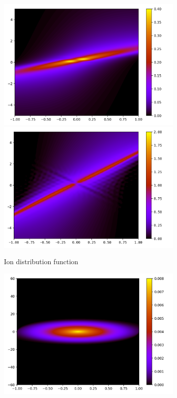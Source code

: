 \documentclass{article}
\numberwithin{equation}{section}
\newcommand{\imh}{\textheight} %
\newcommand{\imw}{\textwidth} %
\begin{document}
\begin{figure}
	\begin{subfigure}{\textwidth}
		\centering
		\includegraphics[height=\imh,width=\imw]{images/fiT20_FD.png}
		\includegraphics[height=\imh,width=\imw]{images/fiT20_512.png}
		\caption{Ion distribution function}
		\label{subfig:compT02_ion}
	\end{subfigure}
	\begin{subfigure}{\textwidth}
		\centering
		\includegraphics[height=\imh,width=\imw]{images/feT20_FD.png}

\end{subfigure}
\end{figure}
\end{document}

